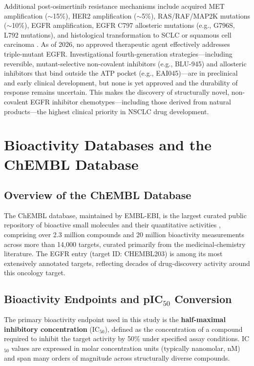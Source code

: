 Additional post-osimertinib resistance mechanisms include acquired MET amplification
($\sim$15\%), HER2 amplification ($\sim$5\%), RAS/RAF/MAP2K mutations ($\sim$10\%),
EGFR amplification, EGFR C797 allosteric mutations (e.g., G796S, L792 mutations),
and histological transformation to SCLC or squamous cell carcinoma
\parencite{rotow2023egfr}. As of 2026, no approved therapeutic agent effectively
addresses triple-mutant EGFR. Investigational fourth-generation strategies---including
reversible, mutant-selective non-covalent inhibitors (e.g., BLU-945) and allosteric
inhibitors that bind outside the ATP pocket (e.g., EAI045)---are in preclinical and
early clinical development, but none is yet approved and the durability of response
remains uncertain. This makes the discovery of structurally novel, non-covalent EGFR
inhibitor chemotypes---including those derived from natural products---the highest
clinical priority in NSCLC drug development.

\section{Bioactivity Databases and the ChEMBL Database}
\label{sec:chembl_db}

\subsection{Overview of the ChEMBL Database}

The ChEMBL database, maintained by EMBL-EBI, is the largest curated public repository
of bioactive small molecules and their quantitative activities
\parencite{mendez2019chembl}, comprising over 2.3 million compounds and 20 million
bioactivity measurements across more than 14,000 targets, curated primarily from the
medicinal-chemistry literature. The EGFR entry (target ID: CHEMBL203) is among its
most extensively annotated targets, reflecting decades of drug-discovery activity
around this oncology target.

\subsection{Bioactivity Endpoints and \texorpdfstring{pIC$_{50}$}{pIC50} Conversion}

The primary bioactivity endpoint used in this study is the \textbf{half-maximal
inhibitory concentration} (IC$_{50}$), defined as the concentration of a compound
required to inhibit the target activity by 50\% under specified assay conditions.
IC$_{50}$ values are expressed in molar concentration units (typically nanomolar,
nM) and span many orders of magnitude across structurally diverse compounds.

